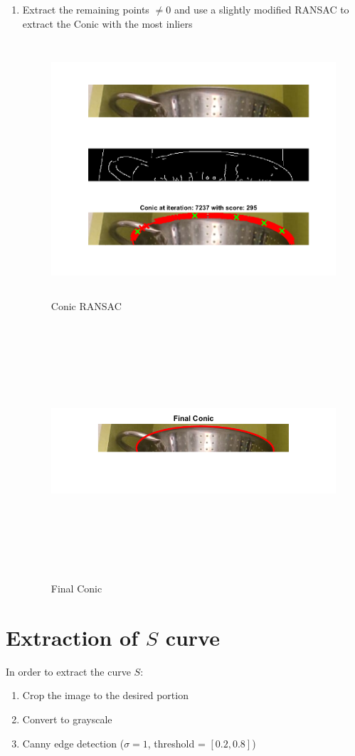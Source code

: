 \begin{enumerate}
    \item Extract the remaining points $\neq 0$ and use a slightly modified RANSAC to extract the Conic with the most inliers 
                \begin{figure}[H]
    \centering
    \includegraphics[height=9.5cm, width=\textwidth, keepaspectratio]{Report/Images/Features/Conic/ConicRANSAC.png}
    \caption{\label{fig:conic:ransac}Conic RANSAC}
    \end{figure}

                    \begin{figure}[H]
    \centering
    \includegraphics[height=9.5cm, width=\textwidth, keepaspectratio]{Report/Images/Features/Conic/FinalConic.png}
    \caption{\label{fig:conic:final}Final Conic}
    \end{figure}

    
\end{enumerate}

\section{Extraction of $S$ curve}

In order to extract the curve $S$:
\begin{enumerate}
    \item Crop the image to the desired portion
    \item Convert to grayscale
    \item Canny edge detection ($\sigma = 1$, threshold = $[0.2, 0.8]$)
\end{enumerate}